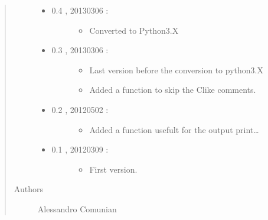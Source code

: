\documentclass[letterpaper,10pt,english]{sphinxmanual}
\begin{document}
\begin{quote}
\begin{description}
\begin{itemize}
\begin{description}
\begin{itemize}
\end{itemize}

\end{description}

\item {} \begin{description}
\item[{0.4 , 2013\sphinxhyphen{}03\sphinxhyphen{}06 :}] \leavevmode\begin{itemize}
\item {} 
Converted to Python3.X

\end{itemize}

\end{description}

\item {} \begin{description}
\item[{0.3 , 2013\sphinxhyphen{}03\sphinxhyphen{}06 :}] \leavevmode\begin{itemize}
\item {} 
Last version before the conversion to python3.X

\item {} 
Added a function to skip the C\sphinxhyphen{}like comments.

\end{itemize}

\end{description}

\item {} \begin{description}
\item[{0.2 , 2012\sphinxhyphen{}05\sphinxhyphen{}02 :}] \leavevmode\begin{itemize}
\item {} 
Added a function usefult for the output print…

\end{itemize}

\end{description}

\item {} \begin{description}
\item[{0.1 , 2012\sphinxhyphen{}03\sphinxhyphen{}09 :}] \leavevmode\begin{itemize}
\item {} 
First version.

\end{itemize}

\end{description}

\end{itemize}

\item[{Authors}] \leavevmode
Alessandro Comunian

\end{description}\end{quote}
\end{document}
